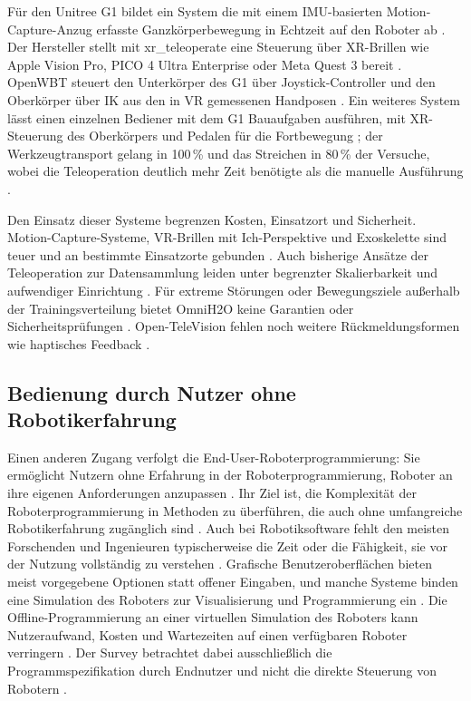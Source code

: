 Für den Unitree G1 bildet ein System die mit einem IMU-basierten Motion-Capture-Anzug erfasste Ganzkörperbewegung in Echtzeit auf den Roboter ab \cite{Durrani2026}.
Der Hersteller stellt mit xr\_teleoperate eine Steuerung über XR-Brillen wie Apple Vision Pro, PICO 4 Ultra Enterprise oder Meta Quest 3 bereit \cite{UnitreeXRTeleop}.
OpenWBT steuert den Unterkörper des G1 über Joystick-Controller und den Oberkörper über IK aus den in VR gemessenen Handposen \cite{GalbotOpenWBT}.
Ein weiteres System lässt einen einzelnen Bediener mit dem G1 Bauaufgaben ausführen, mit XR-Steuerung des Oberkörpers und Pedalen für die Fortbewegung \cite{AliPour2026}; der Werkzeugtransport gelang in 100\,\% und das Streichen in 80\,\% der Versuche, wobei die Teleoperation deutlich mehr Zeit benötigte als die manuelle Ausführung \cite{AliPour2026}.

Den Einsatz dieser Systeme begrenzen Kosten, Einsatzort und Sicherheit.
Motion-Capture-Systeme, VR-Brillen mit Ich-Perspektive und Exoskelette sind teuer und an bestimmte Einsatzorte gebunden \cite{Fu2024}.
Auch bisherige Ansätze der Teleoperation zur Datensammlung leiden unter begrenzter Skalierbarkeit und aufwendiger Einrichtung \cite{Zhao2025}.
Für extreme Störungen oder Bewegungsziele außerhalb der Trainingsverteilung bietet OmniH2O keine Garantien oder Sicherheitsprüfungen \cite{He2024}.
Open-TeleVision fehlen noch weitere Rückmeldungsformen wie haptisches Feedback \cite{Cheng2024}.

\subsection{Bedienung durch Nutzer ohne Robotikerfahrung}
\label{sec:laienbedienung_sdt}
Einen anderen Zugang verfolgt die End-User-Roboterprogrammierung: Sie ermöglicht Nutzern ohne Erfahrung in der Roboterprogrammierung, Roboter an ihre eigenen Anforderungen anzupassen \cite{Ajaykumar2021}.
Ihr Ziel ist, die Komplexität der Roboterprogrammierung in Methoden zu überführen, die auch ohne umfangreiche Robotikerfahrung zugänglich sind \cite{Ajaykumar2021}.
Auch bei Robotiksoftware fehlt den meisten Forschenden und Ingenieuren typischerweise die Zeit oder die Fähigkeit, sie vor der Nutzung vollständig zu verstehen \cite{Coleman2014}.
Grafische Benutzeroberflächen bieten meist vorgegebene Optionen statt offener Eingaben, und manche Systeme binden eine Simulation des Roboters zur Visualisierung und Programmierung ein \cite{Ajaykumar2021}.
Die Offline-Programmierung an einer virtuellen Simulation des Roboters \cite{Ajaykumar2021} kann Nutzeraufwand, Kosten und Wartezeiten auf einen verfügbaren Roboter verringern \cite{Ajaykumar2021}.
Der Survey betrachtet dabei ausschließlich die Programmspezifikation durch Endnutzer und nicht die direkte Steuerung von Robotern \cite{Ajaykumar2021}.

